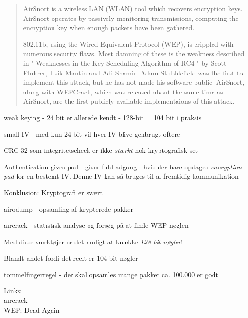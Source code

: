 \documentclass[Screen16to9,17pt]{foils}
\begin{document}


\begin{quote}
AirSnort is a wireless LAN (WLAN) tool which recovers encryption
keys. AirSnort operates by passively monitoring transmissions,
computing the encryption key when enough packets have been gathered.

802.11b, using the Wired Equivalent Protocol (WEP), is crippled with
numerous security flaws. Most damning of these is the weakness
described in " Weaknesses in the Key Scheduling Algorithm of RC4 "
by Scott Fluhrer, Itsik Mantin and Adi Shamir. Adam Stubblefield
was the first to implement this attack, but he has not made his
software public. AirSnort, along with WEPCrack, which was released
about the same time as AirSnort, are the first publicly available
implementaions of this attack.  
\end{quote}



\begin{list1}
\item weak keying - 24 bit er allerede kendt - 128-bit = 104 bit i praksis
\item small IV - med kun 24 bit vil hver IV blive genbrugt oftere
\item CRC-32 som integritetscheck er ikke \emph{stærkt} nok
  kryptografisk set
\item Authentication gives pad - giver fuld adgang - hvis der bare
  opdages \emph{encryption pad} for en bestemt IV. Denne IV kan så
  bruges til al fremtidig kommunikation
\end{list1}

{\hlkbig Konklusion: Kryptografi er svært}



\begin{list1}
\item airodump - opsamling af krypterede pakker
\item aircrack - statistisk analyse og forsøg på at finde WEP nøglen
\item Med disse værktøjer er det muligt at knække \emph{128-bit nøgler}!
\item Blandt andet fordi det reelt er 104-bit nøgler \smiley
\item tommelfingerregel - der skal opsamles mange pakker ca. 100.000
  er godt
\item Links:\\
 aircrack\\
 WEP: Dead Again
\end{list1}
\end{document}
